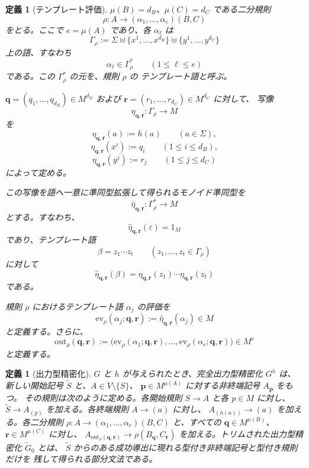 \documentclass[11pt,a4paper]{ltjsarticle}
\newtheorem{definition}[theorem]{定義}
\theoremstyle{remark}
\newcommand{\out}{\mathrm{out}}
\newcommand{\ev}{\mathrm{ev}}
\newcommand{\eps}{\varepsilon}
\begin{document}
\begin{definition}[テンプレート評価]
\label{def:output-map}
\(\mu(B)=d_B\)、\(\mu(C)=d_C\) である二分規則
\[
  \rho\colon
  A\to(\alpha_1,\ldots,\alpha_e)(B,C)
\]
をとる。ここで \(e=\mu(A)\) であり、各 \(\alpha_\ell\) は
\[
  \Gamma_\rho
  :=
  \Sigma
  \uplus
  \{x^1,\ldots,x^{d_B}\}
  \uplus
  \{y^1,\ldots,y^{d_C}\}
\]
上の語、すなわち
\[
  \alpha_\ell\in\Gamma_\rho^*
  \qquad (1\le \ell\le e)
\]
である。この \(\Gamma_\rho^*\) の元を、規則 \(\rho\) の
\emph{テンプレート語}と呼ぶ。

\(\mathbf q=(q_1,\ldots,q_{d_B})\in M^{d_B}\) および
\(\mathbf r=(r_1,\ldots,r_{d_C})\in M^{d_C}\) に対して、
写像
\[
  \eta_{\mathbf q,\mathbf r}\colon\Gamma_\rho\to M
\]
を
\[
  \eta_{\mathbf q,\mathbf r}(a):=h(a)
  \qquad (a\in\Sigma),
\]
\[
  \eta_{\mathbf q,\mathbf r}(x^i):=q_i
  \qquad (1\le i\le d_B),
\]
\[
  \eta_{\mathbf q,\mathbf r}(y^j):=r_j
  \qquad (1\le j\le d_C)
\]
によって定める。

この写像を語へ一意に準同型拡張して得られるモノイド準同型を
\[
  \widehat{\eta}_{\mathbf q,\mathbf r}
  \colon
  \Gamma_\rho^*\to M
\]
とする。すなわち、
\[
  \widehat{\eta}_{\mathbf q,\mathbf r}(\eps)=1_M
\]
であり、テンプレート語
\[
  \beta=z_1\cdots z_t
  \qquad (z_1,\ldots,z_t\in\Gamma_\rho)
\]
に対して
\[
  \widehat{\eta}_{\mathbf q,\mathbf r}(\beta)
  =
  \eta_{\mathbf q,\mathbf r}(z_1)
  \cdots
  \eta_{\mathbf q,\mathbf r}(z_t)
\]
である。

規則 \(\rho\) におけるテンプレート語 \(\alpha_j\) の評価を
\[
  \ev_\rho(\alpha_j;\mathbf q,\mathbf r)
  :=
  \widehat{\eta}_{\mathbf q,\mathbf r}(\alpha_j)
  \in M
\]
と定義する。さらに、
\[
  \out_\rho(\mathbf q,\mathbf r)
  :=
  \bigl(
    \ev_\rho(\alpha_1;\mathbf q,\mathbf r),
    \ldots,
    \ev_\rho(\alpha_e;\mathbf q,\mathbf r)
  \bigr)
  \in M^e
\]
と定義する。
\end{definition}

\begin{definition}[出力型精密化]
\label{def:output-refinement}
\(G\) と \(h\) が与えられたとき、完全出力型精密化 \(G^h\) は、新しい開始記号
\(\widetilde S\) と、\(A\in V\setminus\{S\}\)、
\(\mathbf p\in M^{\mu(A)}\) に対する非終端記号 \(A_{\mathbf p}\) をもつ。
その規則は次のように定める。各開始規則 \(S\to A\) と各 \(p\in M\) に対し、
\(\widetilde S\to A_{(p)}\) を加える。各終端規則 \(A\to(a)\) に対し、
\(A_{(h(a))}\to(a)\) を加える。各二分規則
\(\rho\colon A\to(\alpha_1,\ldots,\alpha_e)(B,C)\) と、すべての
\(\mathbf q\in M^{\mu(B)}\)、\(\mathbf r\in M^{\mu(C)}\) に対し、
\(A_{\out_\rho(\mathbf q,\mathbf r)}\to\rho(B_{\mathbf q},C_{\mathbf r})\)
を加える。トリムされた出力型精密化 \(\widetilde G_0\) とは、
\(\widetilde S\) からのある成功導出に現れる型付き非終端記号と型付き規則だけを
残して得られる部分文法である。
\end{definition}
\end{document}
